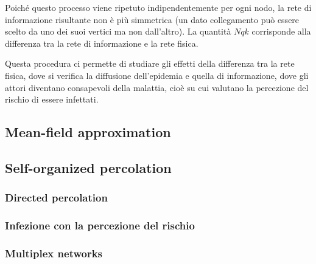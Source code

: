 Poiché questo processo viene ripetuto indipendentemente per ogni nodo, la rete di informazione risultante non è più
simmetrica (un dato collegamento può essere scelto da uno dei suoi vertici ma non dall'altro).
La quantità $Nqk$ corrisponde alla differenza tra la rete di informazione e la rete fisica.

Questa procedura ci permette di studiare gli effetti della differenza tra la rete fisica, dove si verifica la
diffusione dell'epidemia e quella di informazione, dove gli attori diventano consapevoli della malattia,
cioè su cui valutano la percezione del rischio di essere infettati.

\subsection{Mean-field approximation}\label{subsec:mean-field-approximation}

\subsection{Self-organized percolation}\label{subsec:self-organized-percolation}

\subsubsection{Directed percolation}\label{subsubsec:directed-percolation}

\subsubsection{Infezione con la percezione del rischio}\label{subsubsec:infezione-con-la-percezione-del-rischio}

\subsubsection{Multiplex networks}\label{subsubsec:multiplex-networks}